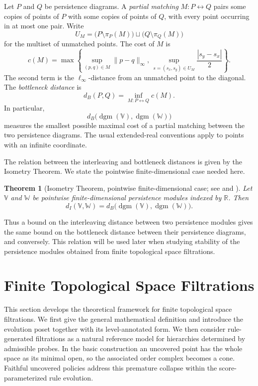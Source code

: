 \documentclass[a4paper,11pt]{article}
\newtheorem{theorem}{Theorem}[section]
\theoremstyle{definition}
\theoremstyle{remark}
\begin{document}
Let $P$ and $Q$ be persistence diagrams. A \emph{partial matching} $M\colon P\leftrightarrow Q$ pairs some copies of points of $P$ with some copies
of points of $Q$, with every point occurring in at most one pair. Write
$$
U_M = \bigl(P\setminus\pi_P(M)\bigr) \sqcup \bigl(Q\setminus\pi_Q(M)\bigr)
$$
for the multiset of unmatched points. The cost of $M$ is
$$
c(M) = \max\left\{\sup_{(p,q)\in M}\|p-q\|_\infty,\, \sup_{s=(s_x,s_y)\in U_M} \frac{|s_y-s_x|}{2} \right\}.
$$
The second term is the $\ell_\infty$-distance from an unmatched point to the diagonal. The \emph{bottleneck distance} is
$$
d_B(P,Q) = \inf_{M\colon P\leftrightarrow Q}c(M).
$$
In particular,
$$
d_B\bigl(\operatorname{dgm}(\mathbb V), \operatorname{dgm}(\mathbb W)\bigr)
$$
measures the smallest possible maximal cost of a partial matching between the two persistence diagrams. The usual extended-real conventions apply to points with an infinite coordinate.

The relation between the interleaving and bottleneck distances is given by the Isometry Theorem. We state the pointwise finite-dimensional case needed here.

\begin{theorem}[Isometry Theorem, pointwise finite-dimensional case; see \cite{CSGO16} and {\cite{Oud15}}]
\label{thm:persistence-isometry}
Let $\mathbb{V}$ and $\mathbb{W}$ be pointwise finite-dimensional persistence modules indexed by $\mathbb{R}$. Then
$$ d_I(\mathbb{V},\mathbb{W})=d_B\bigl(\operatorname{dgm}(\mathbb{V}),\operatorname{dgm}(\mathbb{W})\bigr). $$
\end{theorem}

Thus a bound on the interleaving distance between two persistence modules gives the same bound on the bottleneck distance between their persistence diagrams, and conversely. This relation will be used later when studying stability of the persistence modules obtained from finite topological space filtrations.


\section{Finite Topological Space Filtrations}
\label{sec:fts-filtrations}

This section develops the theoretical framework for finite topological space filtrations. We first give the general mathematical definition and introduce the evolution poset together with its level-annotated form. We then consider rule-generated filtrations as a natural reference model for hierarchies determined by admissible probes. In the basic construction an uncovered point has the whole space as its minimal open, so the associated order complex becomes a cone. Faithful uncovered policies address this premature collapse within the score-parameterized rule evolution.
\end{document}
